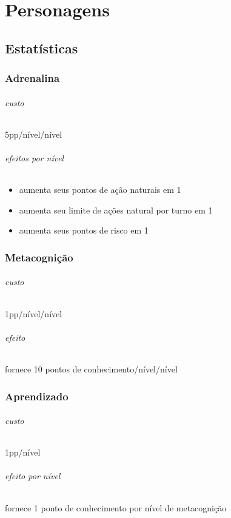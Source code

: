 \clearpage{}
\part{Personagens}
\clearpage{}
\chapter{Estatísticas}
\section{Adrenalina}
\paragraph{custo} 5pp/nível/nível
\paragraph{efeitos por nível}
\begin{itemize}
  \item aumenta seus pontos de ação naturais em 1
  \item aumenta seu limite de ações natural por turno em 1
  \item aumenta seus pontos de risco em 1
\end{itemize}
%
%
\section{Metacognição}
\paragraph{custo} 1pp/nível/nível
\paragraph{efeito} fornece 10 pontos de conhecimento/nível/nível
%
%
\section{Aprendizado}
\paragraph{custo} 1pp/nível
\paragraph{efeito por nível} fornece 1 ponto de conhecimento por nível de metacognição
%
%
